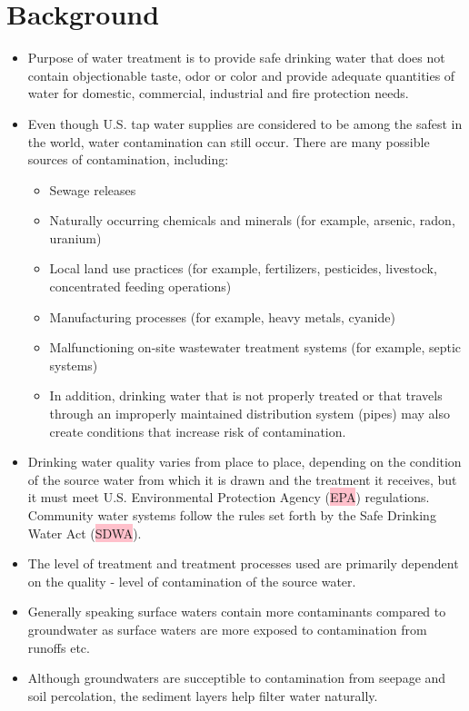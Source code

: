 \section{Background}
\begin{itemize}
\item Purpose of water treatment is to provide safe drinking water that does not contain objectionable taste, odor or color and provide adequate quantities of water for domestic, commercial, industrial and fire protection needs.

\item Even though U.S. tap water supplies are considered to be among the safest in the world, water contamination can still occur. There are many possible sources of contamination, including:
\begin{itemize}
\item Sewage releases
\item Naturally occurring chemicals and minerals (for example, arsenic, radon, uranium)
\item Local land use practices (for example, fertilizers, pesticides, livestock, concentrated feeding operations)
\item Manufacturing processes (for example, heavy metals, cyanide)
\item Malfunctioning on-site wastewater treatment systems (for example, septic systems)
\item In addition, drinking water that is not properly treated or that travels through an improperly maintained distribution system (pipes) may also create conditions that increase risk of contamination.
\end{itemize}

\item Drinking water quality varies from place to place, depending on the condition of the source water from which it is drawn and the treatment it receives, but it must meet U.S. Environmental Protection Agency (\colorbox{pink}{EPA}) regulations. Community water systems follow the rules set forth by the Safe Drinking Water Act (\colorbox{pink}{SDWA}).

\item The level of treatment and treatment processes used are primarily dependent on the quality - level of contamination of the source water.

\item Generally speaking surface waters contain more contaminants compared to groundwater as surface waters are more exposed to contamination from runoffs etc.  
\item Although groundwaters are succeptible to contamination from seepage and soil percolation, the sediment layers help filter water naturally. 


\end{itemize}
